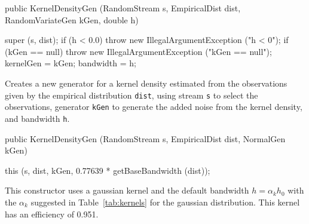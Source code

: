 \begin{code}

   public KernelDensityGen (RandomStream s, EmpiricalDist dist,
                            RandomVariateGen kGen, double h)\begin{hide} {
      super (s, dist);
      if (h < 0.0)
         throw new IllegalArgumentException ("h < 0");
      if (kGen == null)
         throw new IllegalArgumentException ("kGen == null");
      kernelGen = kGen;
      bandwidth = h;
   }\end{hide}
\end{code}
  \begin{tabb}  Creates a new generator for a kernel density estimated 
    from the observations given by the empirical distribution \texttt{dist},
    using stream \texttt{s} to select the observations,
    generator \texttt{kGen} to generate the added noise from the kernel
    density, and bandwidth \texttt{h}.
  \end{tabb}
\begin{code}

   public KernelDensityGen (RandomStream s, EmpiricalDist dist,
                            NormalGen kGen)\begin{hide} {
      this (s, dist, kGen, 0.77639 * getBaseBandwidth (dist));
   }\end{hide}
\end{code}
  \begin{tabb}  
    This constructor uses a gaussian kernel and the default 
    bandwidth $h = \alpha_k h_0$ with the $\alpha_k$ 
    suggested in Table~\ref{tab:kernels} for the gaussian distribution.
    This kernel has an efficiency of 0.951.
  \end{tabb}


